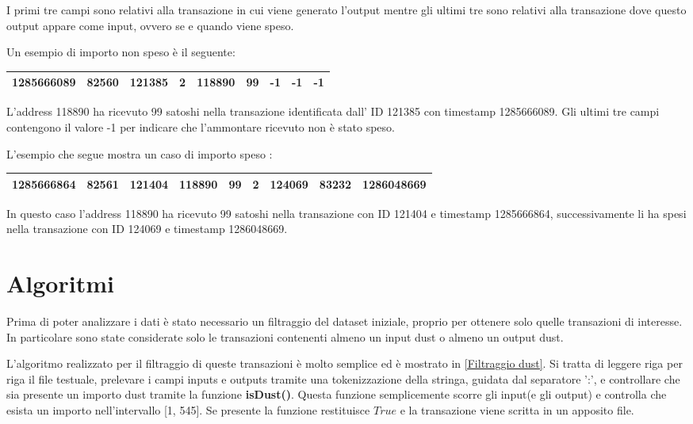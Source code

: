 I primi tre campi sono relativi alla transazione in cui viene generato l'output mentre gli ultimi tre sono relativi alla transazione dove questo output appare come input, ovvero se e quando viene speso.

Un esempio di importo non speso è il seguente:
\begin{table}[h]
\centering
\begin{tabular}{|r|r|r|r|r|r|r|r|r|}
\toprule
1285666089 &    82560 & 121385 &  2 &      118890 &       99 &         -1 &          -1 &              -1 \\
\bottomrule
\end{tabular}
\end{table}
\FloatBarrier
L'address 118890 ha ricevuto 99 satoshi nella transazione identificata dall' ID 121385 con timestamp 1285666089. Gli ultimi tre campi contengono il valore -1 per indicare che l'ammontare ricevuto non è stato speso.

L'esempio che segue mostra un caso di importo speso :
\begin{table}[h]
\centering
\begin{tabular}{|l|l|l|l|l|l|l|l|l|}
\toprule
1285666864 &    82561 & 121404 &  118890 &      99 &           2 &       124069 &       83232 &      1286048669\\
\bottomrule
\end{tabular}
\end{table}
\FloatBarrier
In questo caso l'address 118890 ha ricevuto 99 satoshi nella transazione con ID 121404 e timestamp 1285666864, successivamente li ha spesi nella transazione con ID 124069 e timestamp 1286048669.
\section{Algoritmi}\label{algoritmii}
Prima di poter analizzare i dati è stato necessario un filtraggio del dataset iniziale, proprio per ottenere solo quelle transazioni di interesse. In particolare sono state considerate solo le transazioni contenenti almeno un input dust o almeno un output dust. 

L'algoritmo realizzato per il filtraggio di queste transazioni è molto semplice ed è mostrato in \ref{Filtraggio dust}. Si tratta di leggere riga per riga il file testuale, prelevare i campi inputs e outputs tramite una tokenizzazione della stringa, guidata dal separatore ':', e controllare che sia presente un importo dust tramite la funzione \textbf{isDust()}. Questa funzione semplicemente scorre gli input(e gli output) e controlla che esista un importo nell'intervallo [1, 545]. Se presente la funzione restituisce $True$ e la transazione viene scritta in un apposito file.

